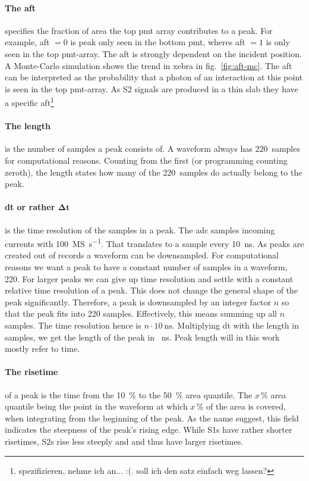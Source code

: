 \paragraph{The \gls{aft}} specifies the fraction of area the top \gls{pmt} array contributes to a peak.
For example, \gls{aft} $ = 0 $ is peak only seen in the bottom \gls{pmt}, wheres \gls{aft} $ = 1 $ is only seen in the top \gls{pmt}-array.
The \gls{aft} is strongly dependent on the incident position.
A Monte-Carlo simulation shows the trend in \gls{xebra} in fig.~\ref{fig:aft-mc}. %
The \gls{aft} can be interpreted as the probability that a photon of an interaction at this point is seen in the top \gls{pmt}-array.
As S2 signals are produced in a thin slab they have a specific \gls{aft}\footnote{spezifizieren, nehme ich an... :(. soll ich den satz einfach weg lassen?}

\paragraph{The length} is the number of samples a peak consists of.
A waveform always has \SI{220}{samples} for computational reasons.
Counting from the first (or programming counting zeroth), the length states how many of the \SI{220}{samples} do actually belong to the peak.

\paragraph{dt or rather $ \mathbf{\Delta t}$} is the time resolution of the samples in a peak.
The \gls{adc} samples incoming currents with \SI{100}{\mega S\per\second}.
That translates to a sample every \SI{10}{\nano\second}.
As peaks are created out of records a waveform can be downsampled.
For computational reasons we want a peak to have a constant number of samples in a waveform, 220.
For larger peaks we can give up time resolution and settle with a constant relative time resolution of a peak.
This does not change the general shape of the peak significantly.
Therefore, a peak is downsampled by an integer factor $ n $ so that the peak fits into 220 samples.
Effectively, this means summing up all $ n $ samples.
The time resolution hence is $ n \cdot \SI{10}{\nano\second} $.
Multiplying dt with the length in samples, we get the length of the peak in \SI{}{\nano\second}.
Peak length will in this work mostly refer to time.

\paragraph{The risetime} of a peak is the time from the \SI{10}{\%} to the \SI{50}{\%} area quantile.
The $ x\,\% $ area quantile being the point in the waveform at which $ x\,\% $ of the area is covered, when integrating from the beginning of the peak.
As the name suggest, this field indicates the steepness of the peak's rising edge.
While S1s have rather shorter risetimes, S2s rise less steeply and and thus have larger risetimes.

